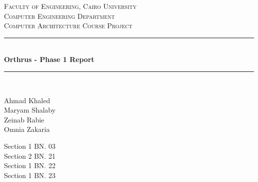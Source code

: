 \documentclass[12pt]{article}
\theoremstyle{plain}
\theoremstyle{definition}
\begin{document}
	
	
\begin{titlepage}

	\newcommand{\HRule}{\rule{\linewidth}{0.5mm}} %
	
	\center %
	 
	
	\textsc{\LARGE Faculty of Engineering, Cairo University}\\[0.5cm] %
	\textsc{\large Computer Engineering Department}\\[1.5cm] %
	
	\textsc{\Large Computer Architecture Course Project}\\[0.5cm] %
	
	
	\HRule \\[0.4cm]
	{ \huge \bfseries Orthrus - Phase 1 Report}\\[0.4cm] %
	\HRule \\[1.5cm]
	 
	
	\begin{minipage}{0.4\textwidth}
	\begin{flushleft} \large
	Ahmad Khaled \\
	Maryam Shalaby \\
	Zeinab Rabie \\
	Omnia Zakaria
	\end{flushleft}
	\end{minipage}
	\begin{minipage}{0.4\textwidth}
	\begin{flushright}\large
        Section 1 BN. 03 \\
        Section 2 BN. 21 \\
        Section 1 BN. 22 \\
        Section 1 BN. 23 \\
	\end{flushright}
	\end{minipage}\\[1cm]
	

\end{titlepage}
\end{document}
